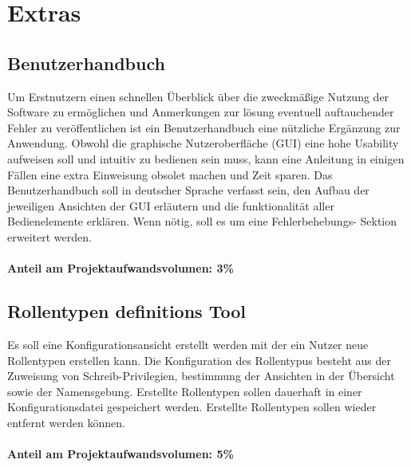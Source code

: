 \section{Extras}
    \subsection{Benutzerhandbuch}

    Um Erstnutzern einen schnellen Überblick über die zweckmäßige Nutzung der
    Software zu ermöglichen und Anmerkungen zur lösung eventuell auftauchender
    Fehler zu veröffentlichen ist ein Benutzerhandbuch eine nützliche Ergänzung
    zur Anwendung. Obwohl die graphische Nutzeroberfläche (GUI) eine hohe
    Usability aufweisen soll und intuitiv zu bedienen sein muss, kann eine
    Anleitung in einigen Fällen eine extra Einweisung obsolet machen und Zeit
    sparen. Das Benutzerhandbuch soll in deutscher Sprache verfasst sein, den
    Aufbau der jeweiligen Ansichten der GUI erläutern und die funktionalität
    aller Bedienelemente erklären. Wenn nötig, soll es um eine Fehlerbehebungs-
    Sektion erweitert werden.\\
    \\
    \textbf{Anteil am Projektaufwandsvolumen: 3\%}


    \subsection{Rollentypen definitions Tool}

    Es soll eine Konfigurationsansicht erstellt werden mit der ein Nutzer neue 
    Rollentypen erstellen kann. Die Konfiguration des Rollentypus besteht aus
    der Zuweisung von Schreib-Privilegien, bestimmung der Ansichten in der
    Übersicht sowie der Namensgebung. Erstellte Rollentypen sollen dauerhaft in
    einer Konfigurationsdatei gespeichert werden. Erstellte Rollentypen sollen 
    wieder entfernt werden können.\\
    \\
    \textbf{Anteil am Projektaufwandsvolumen: 5\%}
